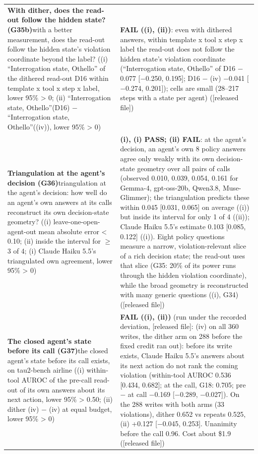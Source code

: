 {\begin{longtable}{p{}p{}}
\textbf{With dither, does the read-out follow the hidden state? (G35b)}\newline with a better measurement, does the read-out follow the hidden state's violation coordinate beyond the label? ((i) ``Interrogation state, Othello'' of the dithered read-out D16 within template x tool x step x label, lower 95\% > 0; (ii) ``Interrogation state, Othello''(D16) $-$ ``Interrogation state, Othello''((iv)), lower 95\% > 0) & \textbf{FAIL ((i), (ii))}: even with dithered answers, within template x tool x step x label the read-out does not follow the hidden state's violation coordinate (``Interrogation state, Othello'' of D16 $-$0.077 [$-$0.250, 0.195]; D16 $-$ (iv) $-$0.041 [$-$0.274, 0.201]); cells are small (28--217 steps with a state per agent) ([released file])\\[2pt]
\textbf{Triangulation at the agent's decision (G36)}\newline triangulation at the agent's decision: how well do an agent's own answers at its calls reconstruct its own decision-state geometry? ((i) leave-one-open-agent-out mean absolute error < 0.10; (ii) inside the interval for $\geq$ 3 of 4; (i) Claude Haiku 5.5's triangulated own agreement, lower 95\% > 0) & \textbf{(i), (i) PASS; (ii) FAIL}: at the agent's decision, an agent's own 8 policy answers agree only weakly with its own decision-state geometry over all pairs of calls (observed 0.010, 0.039, 0.054, 0.161 for Gemma-4, gpt-oss-20b, Qwen3.8, Muse-Glimmer); the triangulation predicts these within 0.045 [0.031, 0.065] on average ((i)) but inside its interval for only 1 of 4 ((ii)); Claude Haiku 5.5's estimate 0.103 [0.085, 0.122] ((i)). Eight policy questions measure a narrow, violation-relevant slice of a rich decision state; the read-out uses that slice (G35: 20\% of its power runs through the hidden violation coordinate), while the broad geometry is reconstructed with many generic questions ((i), G34) ([released file])\\[2pt]
\textbf{The closed agent's state before its call (G37)}\newline the closed agent's state before its call exists, on tau2-bench airline ((i) within-tool AUROC of the pre-call read-out of its own answers about its next action, lower 95\% > 0.50; (ii) dither (iv) $-$ (iv) at equal budget, lower 95\% > 0) & \textbf{FAIL ((i), (ii))} (run under the recorded deviation, [released file]: (iv) on all 360 writes, the dither arm on 288 before the fixed credit ran out): before its write exists, Claude Haiku 5.5's answers about its next action do not rank the coming violation (within-tool AUROC 0.536 [0.434, 0.682]; at the call, G18: 0.705; pre $-$ at call $-$0.169 [$-$0.289, $-$0.027]). On the 288 writes with both arms (33 violations), dither 0.652 vs repeats 0.525, (ii) +0.127 [$-$0.045, 0.253]. Unanimity before the call 0.96. Cost about \$1.9 ([released file])\\[2pt]

\end{longtable}}
